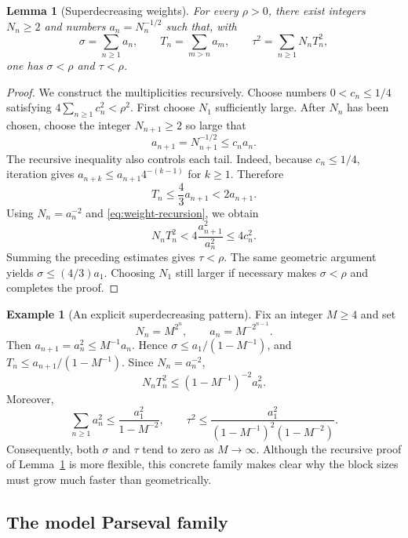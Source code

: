 \documentclass[reqno]{amsart}
\numberwithin{equation}{section}
\newtheorem{lemma}[theorem]{Lemma}
\theoremstyle{definition}
\newtheorem{example}[theorem]{Example}
\theoremstyle{remark}
\begin{document}
\begin{lemma}[Superdecreasing weights]\label{lem:weights}
For every $\rho>0$, there exist integers $N_n\geq2$ and numbers
$a_n=N_n^{-1/2}$ such that, with
\begin{equation}\label{eq:weight-quantities}
 \sigma=\sum_{n\geq1}a_n,
 \qquad T_n=\sum_{m>n}a_m,
 \qquad \tau^2=\sum_{n\geq1}N_nT_n^2,
\end{equation}
one has $\sigma<\rho$ and $\tau<\rho$.
\end{lemma}

\begin{proof}
We construct the multiplicities recursively.  Choose numbers
$0<c_n\leq1/4$ satisfying
$4\sum_{n\geq1}c_n^2<\rho^2$.  First choose $N_1$ sufficiently large.
After $N_n$ has been chosen, choose the integer $N_{n+1}\geq2$ so large that
\begin{equation}\label{eq:weight-recursion}
 a_{n+1}=N_{n+1}^{-1/2}\leq c_na_n.
\end{equation}
The recursive inequality also controls each tail.  Indeed, because
$c_n\leq1/4$, iteration gives
$a_{n+k}\leq a_{n+1}4^{-(k-1)}$ for $k\geq1$.  Therefore
\begin{equation}\label{eq:tail-bound}
 T_n\leq \frac43a_{n+1}<2a_{n+1}.
\end{equation}
Using $N_n=a_n^{-2}$ and \eqref{eq:weight-recursion}, we obtain
\[
 N_nT_n^2
 <4\frac{a_{n+1}^2}{a_n^2}
 \leq4c_n^2.
\]
Summing the preceding estimates gives $\tau<\rho$.  The same geometric
argument yields $\sigma\leq(4/3)a_1$.  Choosing $N_1$ still larger if
necessary makes $\sigma<\rho$ and completes the proof.
\end{proof}

\begin{example}[An explicit superdecreasing pattern]\label{ex:explicit-weights}
Fix an integer $M\geq4$ and set
\[
 N_n=M^{2^n},\qquad a_n=M^{-2^{n-1}}.
\]
Then $a_{n+1}=a_n^2\leq M^{-1}a_n$.  Hence
$\sigma\leq a_1/(1-M^{-1})$, and
$T_n\leq a_{n+1}/(1-M^{-1})$.  Since $N_n=a_n^{-2}$,
\[
 N_nT_n^2
 \leq (1-M^{-1})^{-2}a_n^2.
\]
Moreover,
\[
 \sum_{n\geq1}a_n^2
 \leq \frac{a_1^2}{1-M^{-2}},
 \qquad
 \tau^2\leq
 \frac{a_1^2}{(1-M^{-1})^2(1-M^{-2})}.
\]
Consequently, both $\sigma$ and $\tau$ tend to zero as $M\to\infty$.  Although
the recursive proof of Lemma~\ref{lem:weights} is more flexible, this concrete
family makes clear why the block sizes must grow much faster than
geometrically.
\end{example}

\subsection{The model Parseval family}
\end{document}
